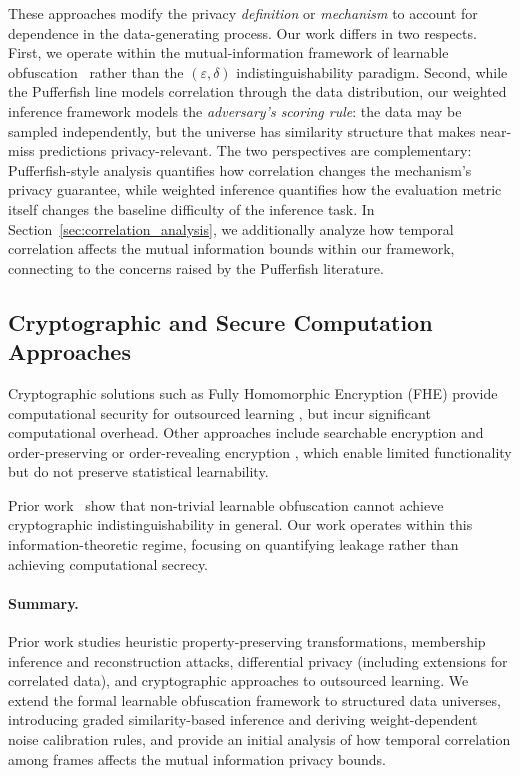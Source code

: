 \documentclass[letterpaper]{article} %
\begin{document}
These approaches modify the privacy \emph{definition} or \emph{mechanism} to account for dependence in the data-generating process. Our work differs in two respects. First, we operate within the mutual-information framework of learnable obfuscation~\cite{xiao2024formal} rather than the $(\varepsilon,\delta)$ indistinguishability paradigm. Second, while the Pufferfish line models correlation through the data distribution, our weighted inference framework models the \emph{adversary's scoring rule}: the data may be sampled independently, but the universe has similarity structure that makes near-miss predictions privacy-relevant. The two perspectives are complementary: Pufferfish-style analysis quantifies how correlation changes the mechanism's privacy guarantee, while weighted inference quantifies how the evaluation metric itself changes the baseline difficulty of the inference task. In Section~\ref{sec:correlation_analysis}, we additionally analyze how temporal correlation affects the mutual information bounds within our framework, connecting to the concerns raised by the Pufferfish literature.

\subsection{Cryptographic and Secure Computation Approaches}

Cryptographic solutions such as Fully Homomorphic Encryption (FHE) provide computational security for outsourced learning \cite{gentry2009fhe,gorantala2023fhe}, but incur significant computational overhead. Other approaches include searchable encryption \cite{kamara2013parallel,stefanov2013dynamic} and order-preserving or order-revealing encryption \cite{agrawal2004order,popa2013ideal,lewi2016order}, which enable limited functionality but do not preserve statistical learnability.

Prior work~\cite{xiao2024formal} show that non-trivial learnable obfuscation cannot achieve cryptographic indistinguishability in general. Our work operates within this information-theoretic regime, focusing on quantifying leakage rather than achieving computational secrecy.

\paragraph{Summary.}
Prior work studies heuristic property-preserving transformations, membership inference and reconstruction attacks, differential privacy (including extensions for correlated data), and cryptographic approaches to outsourced learning. We extend the formal learnable obfuscation framework to structured data universes, introducing graded similarity-based inference and deriving weight-dependent noise calibration rules, and provide an initial analysis of how temporal correlation among frames affects the mutual information privacy bounds.
\end{document}
